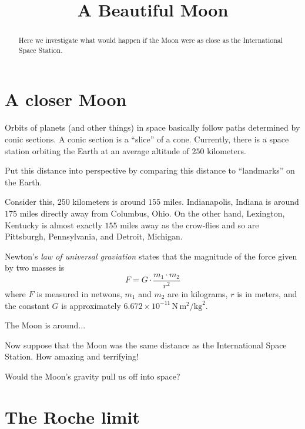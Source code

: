 \documentclass{ximera}
\title{A Beautiful Moon}
\begin{document}
\begin{abstract}
Here we investigate what would happen if the Moon were as close as the
International Space Station.
\end{abstract}
\maketitle

\section*{A closer Moon}

Orbits of planets (and other things) in space basically follow paths
determined by conic sections. A conic section is a ``slice'' of a
cone. Currently, there is a space station orbiting the Earth at an average
altitude of $250$ kilometers.

\begin{question}
Put this distance into perspective by comparing this distance to
``landmarks'' on the Earth.
\begin{solution}
\begin{freeResponse}
Consider this, $250$ kilometers is around $155$ miles. Indianapolis,
Indiana is around $175$ miles directly away from Columbus, Ohio. On
the other hand, Lexington, Kentucky is almost exactly $155$ miles away
as the crow-flies and so are Pittsburgh, Pennsylvania, and Detroit,
Michigan.
\end{freeResponse}
\end{solution}
\end{question}


Newton's \textit{law of universal graviation} states that the
magnitude of the force given by two masses is
\[
F = G \cdot \frac{m_1\cdot m_2}{r^2} 
\]
where $F$ is measured in netwons, $m_1$ and $m_2$ are in kilograms, $r$ is in meters, and the constant $G$ is approximately $6.672\times 10^{-11}\, \mathrm{N}\, \mathrm{m}^2/\mathrm{kg}^2$. 

The Moon is around...


Now suppose that the Moon was the same distance as the International
Space Station. How amazing and terrifying!

\begin{question}
Would the Moon's gravity pull us off into space? 
\end{question}

\section*{The Roche limit} %
\end{document}
